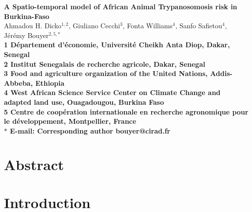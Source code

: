 \documentclass[10pt]{article}
\date{}
\title{}
\begin{document}
\begin{flushleft}
{\Large
{\bfseries A Spatio-temporal model of African Animal Trypanosomosis risk in Burkina-Faso}
}\\

Ahmadou H. Dicko$^{1,2}$, 
Giuliano Cecchi$^{3}$, 
Fonta Williams$^{4}$, 
Sanfo Safietou$^{4}$, 
J\'{e}r\'{e}my Bouyer$^{2,5,\ast}$
\\
\bf{1} D\'{e}partement d'\'{e}conomie, Universit\'{e} Cheikh Anta Diop, Dakar, Senegal
\\
\bf{2} Institut Senegalais de recherche agricole, Dakar, Senegal
\\
\bf{3} Food and agriculture organization of the United Nations, Addis-Abbeba, Ethiopia
\\
\bf{4} West African Science Service Center on Climate Change and adapted land use, Ouagadougou, Burkina Faso
\\
\bf{5} Centre de coop\'{e}ration internationale en recherche agronomique pour le d\'{e}veloppement, Montpellier, France
\\
$\ast$ E-mail: Corresponding author bouyer@cirad.fr
\end{flushleft}


\section*{Abstract}
\label{unnumbered-1}
\section*{Introduction}
\label{unnumbered-2}
\end{document}
